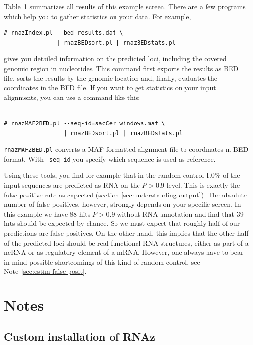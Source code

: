 \documentclass[11pt]{article}
\begin{document}
Table~1 summarizes all results of this example screen. There are a few
programs which help you to gather statistics on your data. For example,

\begin{verbatim}
# rnazIndex.pl --bed results.dat \
               | rnazBEDsort.pl | rnazBEDstats.pl
\end{verbatim}

gives you detailed information on the predicted loci, including the covered
genomic region in nucleotides. This command first exports the results as
BED file, sorts the results by the genomic location and, finally, evaluates
the coordinates in the BED file. If you want to get statistics on your
input alignments, you can use a command like this:

\begin{verbatim}

# rnazMAF2BED.pl --seq-id=sacCer windows.maf \
                 | rnazBEDsort.pl | rnazBEDstats.pl

\end{verbatim}

\texttt{rnazMAF2BED.pl} converts a MAF formatted alignment file to
coordinates in BED format. With \texttt{--seq-id} you specify which
sequence is used as reference.

Using these tools, you find for example that in the random control 1.0\% of
the input sequences are predicted as RNA on the $P>$0.9 level. This is
exactly the false positive rate as expected (section
\ref{sec:understanding-output}). The absolute number of false positives,
however, strongly depends on your specific screen. In this example we have
88 hits $P>$0.9 without RNA annotation and find that 39 hits should be
expected by chance. So we must expect that roughly half of our predictions
are false positives. On the other hand, this implies that the other half of
the predicted loci should be real functional RNA structures, either as part
of a ncRNA or as regulatory element of a mRNA. However, one always have to
bear in mind possible shortcomings of this kind of random control, see
Note~\ref{sec:estim-false-posit}.



\section{Notes}

\subsection{Custom installation of RNAz}
\label{sec:cust-inst-rnaz}
\end{document}
